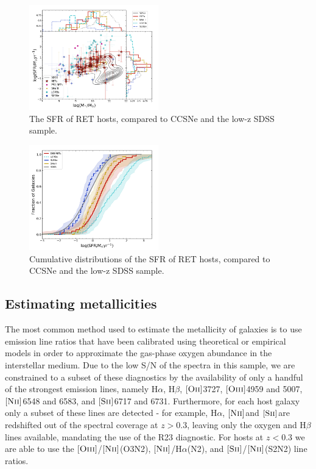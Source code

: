 \documentclass[fleqn,usenatbib,]{mnras}
\newcommand{\halpha}[0]{H$\alpha$}
\newcommand{\hbeta}[0]{H$\beta$}
\newcommand{\OII}[0]{$[\textnormal{\textsc{Oii}}]$}
\newcommand{\OIII}[0]{$[\textnormal{\textsc{Oiii}}]$}
\newcommand{\SII}[0]{$[\textnormal{\textsc{Sii}}]$}
\newcommand{\NII}[0]{$[\textnormal{\textsc{Nii}}]$}
\begin{document}
\begin{figure}
\includegraphics[width=0.5\textwidth]{figs/SFR_Mike.png}
\caption{The SFR of RET hosts, compared to CCSNe and the low-z SDSS sample.
\label{fig:sfms_sfr}}
\end{figure}

\begin{figure}
\includegraphics[width=0.5\textwidth]{figs/cum_SFR_mike.png}
\caption{Cumulative distributions of the SFR of RET hosts, compared to CCSNe and the low-z SDSS sample.
\label{fig:sfr_cum}}
\end{figure}
\subsection{Estimating metallicities \label{subsec:calc_Z}}

The most common method used to estimate the metallicity of galaxies is to use emission line ratios that have been calibrated using theoretical or empirical models in order to approximate the gas-phase oxygen abundance in the interstellar medium. Due to the low S/N of the spectra in this sample, we are constrained to a subset of these diagnostics by the availability of only a handful of the strongest emission lines, namely \halpha, \hbeta, \OII 3727, \OIII 4959 and 5007, \NII 6548 and 6583, and \SII 6717 and 6731. Furthermore, for each host galaxy only a subset of these lines are detected - for example, \halpha, \NII and \SII are redshifted out of the spectral coverage at $z>0.3$, leaving only the oxygen and \hbeta lines available, mandating the use of the R23 diagnostic. For hosts at $z<0.3$ we are able to use the \OIII /\NII (O3N2), \NII /\halpha (N2), and \SII /\NII (S2N2) line ratios. 
\end{document}
